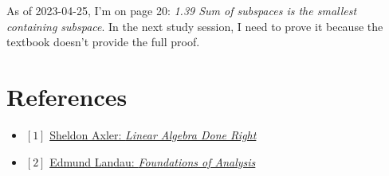 \documentclass[12pt, letterpaper, oneside]{book}
\begin{document}
As of 2023-04-25, I'm on page 20: \textit{1.39 Sum of subspaces is the smallest
containing subspace}. In the next study session, I need to prove it because the
textbook doesn't provide the full proof.

\chapter*{References}

\begin{itemize}
  \item $[1]$ \href{https://linear.axler.net/}{Sheldon Axler: \it{Linear Algebra Done Right}}
  \item $[2]$ \href{https://bookstore.ams.org/view?ProductCode=CHEL/79}{Edmund Landau: \it{Foundations of Analysis}}
\end{itemize}
\end{document}
